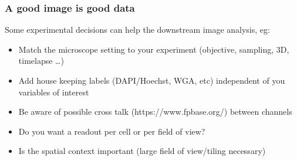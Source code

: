 \documentclass[ignorenonframetext,aspectratio=169,10pt,xcolor=table]{beamer}
\begin{document}
\begin{frame} \frametitle{A good image is good data}
  Some experimental decisions can help the downstream image analysis, eg:\\[1em]
  \begin{itemize}
    \item Match the microscope setting to your experiment (objective, sampling, 3D, timelapse \dots)
    \item Add house keeping labels (DAPI/Hoechst, WGA, etc) independent of you variables of interest
    \item Be aware of possible cross talk (https://www.fpbase.org/) between channels
    \item Do you want a readout per cell or per field of view?
    \item Is the spatial context important (large field of view/tiling necessary)
  \end{itemize}
\end{frame}
\end{document}
